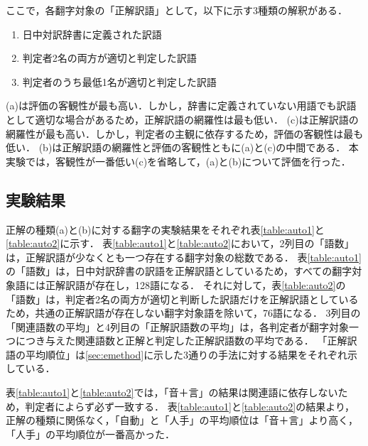 \documentclass[japanese]{jnlp_1.4}
\begin{document}
{ここで，各翻字対象の「正解訳語」として，以下に示す3種類の解釈がある．
    \begin{enumerate}
    \makeatletter\renewcommand{\theenumi}{}\makeatother
\item 日中対訳辞書\cite{Book_02}に定義された訳語
\item 判定者2名の両方が適切と判定した訳語
\item 判定者のうち最低1名が適切と判定した訳語
\end{enumerate}
(a)は評価の客観性が最も高い．しかし，辞書に定義されていない用語でも訳語として適切な場合があるため，正解訳語の網羅性は最も低い．
(c)は正解訳語の網羅性が最も高い．しかし，判定者の主観に依存するため，評価の客観性は最も低い．
(b)は正解訳語の網羅性と評価の客観性ともに(a)と(c)の中間である．
本実験では，客観性が一番低い(c)を省略して，(a)と(b)について評価を行った．



\subsection{実験結果}\label{sec:result}

\begin{table}[b]
\caption{正解の種類(a)に対する正解訳語の平均順位}
\label{table:auto1}

\end{table}
\begin{table}[b]
\caption{正解の種類(b)に対する正解訳語の平均順位}
\label{table:auto2}

\end{table}


正解の種類(a)と(b)に対する翻字の実験結果をそれぞれ表\ref{table:auto1}と\ref{table:auto2}に示す．
表\ref{table:auto1}と\ref{table:auto2}において，2列目の「語数」は，正解訳語が少なくとも一つ存在する翻字対象の総数である．
表\ref{table:auto1}の\mbox{「語数」}は，日中対訳辞書の訳語を正解訳語としているため，すべての翻字対象語には正解訳語が存在し，128語になる．
それに対して，表\ref{table:auto2}の「語数」は，判定者2名の両方が適切と判断した訳語だけを正解訳語としているため，共通の正解訳語が存在しない翻字対象語を除いて，76語になる．
3列目の「関連語数の平均」と4列目の「正解訳語数の平均」は，各判定者が翻字対象一つにつき与えた関連語数と正解と判定した正解訳語数の平均である．
「正解訳語の平均順位」は\ref{sec:emethod}に示した3通りの手法に対する結果をそれぞれ示している．

表\ref{table:auto1}と\ref{table:auto2}では，「音＋言」の結果は関連語に依存しないため，判定者によらず必ず一致する．
表\ref{table:auto1}と\ref{table:auto2}の結果より，正解の種類に関係なく，「自動」と「人手」の平均順位は「音＋言」より高く，「人手」の平均順位が一番高かった．

}
\end{document}
